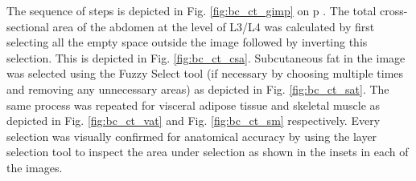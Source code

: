 The sequence of steps is depicted in Fig. \ref{fig:bc_ct_gimp} on p	\pageref{fig:bc_ct_gimp}. The total cross-sectional area of the abdomen at the level of L3/L4 was calculated by first selecting all the empty space outside the image followed by inverting this selection. This is depicted in Fig. \ref{fig:bc_ct_csa}. Subcutaneous fat in the image was selected using the Fuzzy Select tool (if necessary by choosing multiple times and removing any unnecessary areas) as depicted in Fig. \ref{fig:bc_ct_sat}. The same process was repeated for visceral adipose tissue and skeletal muscle as depicted in Fig. \ref{fig:bc_ct_vat} and Fig. \ref{fig:bc_ct_sm} respectively. Every selection was visually confirmed for anatomical accuracy by using the layer selection tool to inspect the area under selection as shown in the insets in each of the images.
